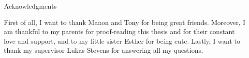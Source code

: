 \thispagestyle{empty}

\vspace*{20mm}

\begin{center}
{ Acknowledgments}
\end{center}

\vspace{10mm}

First of all, I want to thank Manon and Tony for being great friends.
Moreover, I am thankful to my parents for proof-reading this thesis and for their constant love and support, and to my little sister Esther for being cute.
Lastly, I want to thank my supervisor Lukas Stevens for answering all my questions.


\cleardoublepage{}
